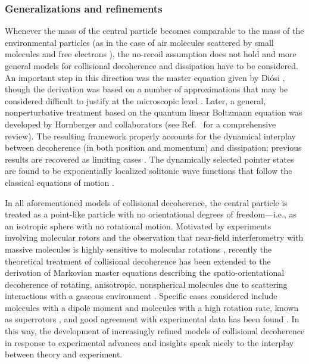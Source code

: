 \documentclass[3p,sort&compress]{elsarticle}
\begin{document}
\subsubsection{Generalizations and refinements}

Whenever the mass of the central particle becomes comparable to the mass of the environmental particles (as in the case of air molecules scattered by small molecules and free electrons \cite{Tegmark:1993:uz}), the no-recoil assumption does not hold and more general models for collisional decoherence and dissipation have to be considered. An important step in this direction was the master equation given by Di{\'o}si \cite{Diosi:1995:um}, though the derivation was based on a number of approximations that may be considered difficult to justify at the microscopic level \cite{Hornberger:2008:ii}. Later, a general, nonperturbative treatment based on the quantum linear Boltzmann equation was developed by Hornberger and collaborators \cite{Hornberger:2006:tb,Hornberger:2006:tc,Hornberger:2008:ii,Busse:2009:aa,Vacchini:2009:pp,Busse:2010:aa,Busse:2010:oo} (see Ref.~\cite{Vacchini:2009:pp} for a comprehensive review). The resulting framework properly accounts for the dynamical interplay between decoherence (in both position and momentum) and dissipation; previous results are recovered as limiting cases \cite{Hornberger:2006:tb,Hornberger:2006:tc,Hornberger:2008:ii,Vacchini:2009:pp,Busse:2010:oo}. The dynamically selected pointer states are found to be exponentially localized solitonic wave functions that follow the classical equations of motion \cite{Busse:2009:aa,Busse:2010:aa}. 

In all aforementioned models of collisional decoherence, the central particle is treated as a point-like particle with no orientational degrees of freedom---i.e., as an isotropic sphere with no rotational motion. Motivated by experiments involving molecular rotors and the observation that near-field interferometry with massive molecules is highly sensitive to molecular rotations \cite{Gring:2010:aa,Stickler:2015:zz}, recently the theoretical treatment of collisional decoherence has been extended to the derivation of Markovian master equations describing the spatio-orientational decoherence of rotating, anisotropic, nonspherical molecules due to scattering interactions with a gaseous environment \cite{Walter:2016:zz,Stickler:2016:yy,Papendell:2017:yy, Stickler:2018:oo,Stickler:2018:uu}. Specific cases considered include molecules with a dipole moment \cite{Walter:2016:zz} and molecules with a high rotation rate, known as superrotors \cite{Stickler:2018:oo}, and good agreement with experimental data has been found \cite{Stickler:2018:oo}. In this way, the development of increasingly refined models of collisional decoherence in response to experimental advances and insights speak nicely to the interplay between theory and experiment. 
\end{document}
